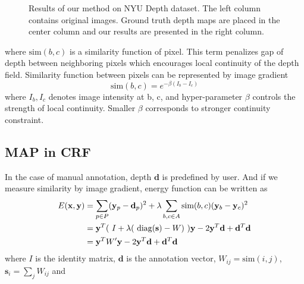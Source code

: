 \documentclass[10pt,twocolumn,letterpaper]{article}
\begin{document}
\begin{figure}[!ht]
\begin{center}
\end{center}
   \caption{Results of our method on NYU Depth dataset. The left column contains original images. Ground truth depth maps are placed in the center column and our results are presented in the right column.}
\label{fig:short}
\end{figure} 

where $\text{sim}(b, c)$ is a similarity function of pixel. This term penalizes gap of depth between neighboring pixels which encourages local continuity of the depth field.
Similarity function between pixels can be represented by image gradient
\begin{equation}
\text{sim}(b, c) = e^{-\beta (I_b-I_c)}
\end{equation}
where $I_b, I_c$ denotes image intensity at b, c, and hyper-parameter $\beta$ controls the strength of local continuity. Smaller $\beta$ corresponds to stronger continuity constraint.

\subsection{MAP in CRF}
In the case of manual annotation, depth $\mathbf{d}$ is predefined by user. And if we measure similarity by image gradient, energy function can be written as
\begin{align}
E(\mathbf{x}, \mathbf{y}) &= \sum_{p \in P} (\mathbf{y}_p-\mathbf{d}_p)^2 + \lambda \sum_{b, c \in A}\text{sim}(b, c)(\mathbf{y}_b-\mathbf{y}_c)^2 \notag \\
&= \mathbf{y}^T (\ I+\lambda(\ \text{diag}(\mathbf{s}) - W )\ )\mathbf{y}-2\mathbf{y}^T\mathbf{d}+\mathbf{d}^T\mathbf{d}  \notag
\\ &= \mathbf{y}^T W'\mathbf{y}-2\mathbf{y}^T\mathbf{d}+\mathbf{d}^T\mathbf{d} 
\end{align}
where $I$ is the identity matrix, $\mathbf{d}$ is the annotation vector, $W_{ij} = \text{sim}(i, j) $, $\mathbf{s}_i = \sum_j W_{ij}$ and
\end{document}
